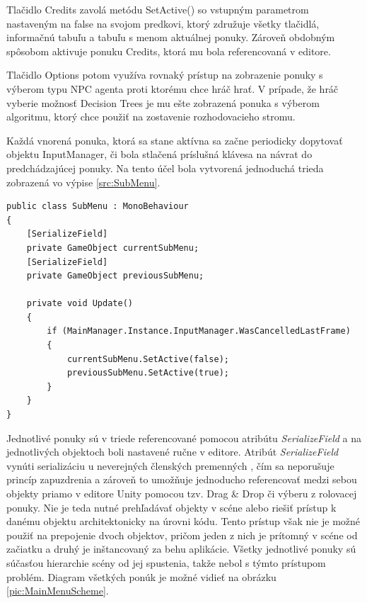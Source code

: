 \documentclass[slovak, master]{diploma}
\begin{document}
Tlačidlo Credits zavolá metódu SetActive() so vstupným parametrom nastaveným na false na svojom predkovi, ktorý združuje všetky tlačidlá, informačnú tabuľu a tabuľu s menom aktuálnej ponuky. Zároveň obdobným spôsobom aktivuje ponuku Credits, ktorá mu bola referencovaná v editore. 

Tlačidlo Options potom využíva rovnaký prístup na zobrazenie ponuky s výberom typu NPC agenta proti ktorému chce hráč hrať. V prípade, že hráč vyberie možnosť Decision Trees je mu ešte zobrazená ponuka s výberom algoritmu, ktorý chce použiť na zostavenie rozhodovacieho stromu.

Každá vnorená ponuka, ktorá sa stane aktívna sa začne periodicky dopytovať objektu InputManager, či bola stlačená príslušná klávesa na návrat do predchádzajúcej ponuky. Na tento účel bola vytvorená jednoduchá trieda zobrazená vo výpise \ref{src:SubMenu}.

\vspace{8pt}
\begin{lstlisting}[label=src:SubMenu,caption={Trieda SubMenu}]
public class SubMenu : MonoBehaviour
{
    [SerializeField]
    private GameObject currentSubMenu;
    [SerializeField]
    private GameObject previousSubMenu;

    private void Update()
    {
        if (MainManager.Instance.InputManager.WasCancelledLastFrame)
        {
            currentSubMenu.SetActive(false);
            previousSubMenu.SetActive(true);
        }
    }
}
\end{lstlisting}

Jednotlivé ponuky sú v triede referencované pomocou atribútu \textit{SerializeField} a na jednotlivých objektoch boli nastavené ručne v editore. Atribút \textit{SerializeField} vynúti serializáciu u neverejných členských premenných \cite{SerializeField}, čím sa neporušuje princíp zapuzdrenia a zároveň to umožňuje jednoducho referencovať medzi sebou objekty priamo v editore Unity pomocou tzv. Drag \& Drop či výberu z rolovacej ponuky. Nie je teda nutné prehľadávať objekty v scéne alebo riešiť prístup k danému objektu architektonicky na úrovni kódu. Tento prístup však nie je možné použiť na prepojenie dvoch objektov, pričom jeden z nich je prítomný v scéne od začiatku a druhý je inštancovaný za behu aplikácie. Všetky jednotlivé ponuky sú súčasťou hierarchie scény od jej spustenia, takže nebol s týmto prístupom problém. Diagram všetkých ponúk je možné vidieť na obrázku \ref{pic:MainMenuScheme}.
\end{document}
